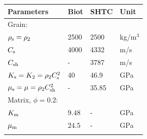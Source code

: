\documentclass[3p,times,table]{article}
\newcommand{\tort}{{\mathcal{T}}}
\newcommand{\Km}{K_{\rm m}}
\newcommand{\Ks}{K_{\rm s}}
\newcommand{\mus}{\mu_{\rm s}}
\newcommand{\rhos}{\rho_{\rm s}}
\newcommand{\Cs}{C_{\rm s}}
\newcommand{\Csh}{C_{\rm sh}}
\begin{document}
\begin{table}[t]
	\begin{center}
		\begin{tabular}{llll}
			\hline
			Parameters\hspace{1cm}                   & Biot\hspace{2cm} & 
			SHTC          & 
			Unit                           \\ \hline
			Grain:		& & &\\[1mm]
			\rowcolor[HTML]{ECF4FF} 
			$ \rhos = \rho_2 $      & 2500   &        2500             & kg/m$ 
			^3 
			$                      \\[1mm]
			\rowcolor[HTML]{CBCEFB} 
			$ \Cs  $     &  4000       &   4332        & 
			m/s                              \\[1mm]
			\rowcolor[HTML]{ECF4FF}
			$ \Csh  $  &  -       &   3787        & 
			m/s                              \\[1mm]
			\rowcolor[HTML]{CBCEFB} 
			$ \Ks = K_2 = \rho_2 \Cs^2 $  &   40       &   46.9        & 
			GPa      \\[1mm]
			\rowcolor[HTML]{ECF4FF}
			$ \mus = \mu = \rho_2 \Csh^2 $&   -       &  35.85        & GPa 
			\\[1mm]
			Matrix, $\phi =0.2$:		& & &\\[1mm]
			\rowcolor[HTML]{CBCEFB} 
			$ \Km $     & $ 9.48 $       &    -     & GPa                      
			\\[1mm]
			\rowcolor[HTML]{ECF4FF} 
			$ \mu_{\rm m} $     & $ 24.5 $       &    -     & 
			GPa                      \\[1mm]
			\rowcolor[HTML]{CBCEFB} 

\end{tabular}
\end{center}
\end{table}
\end{document}
